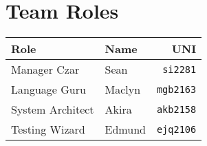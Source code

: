 \documentclass{scrartcl}
\begin{document}
\section{Team Roles}
\begin{center}
\begin{tabular}{l l r}
 Role & Name & UNI\\
 \hline
 Manager Czar & Sean & \verb|si2281|\\
 Language Guru & Maclyn & \verb|mgb2163|\\
 System Architect & Akira & \verb|akb2158|\\
 Testing Wizard & Edmund & \verb|ejq2106|
\end{tabular}
\end{center}
\end{document}
